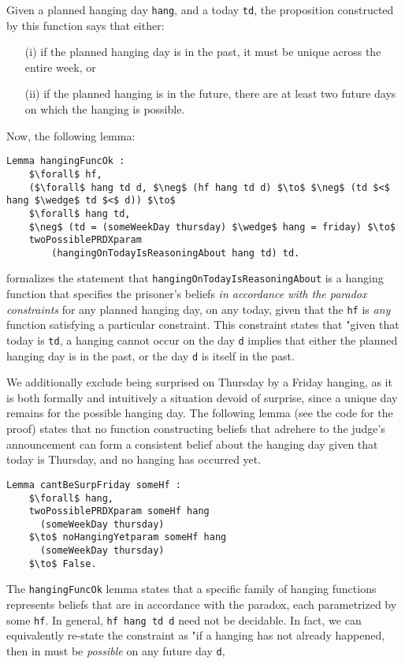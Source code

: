\documentclass[runningheads]{llncs}
\begin{document}
Given a planned hanging day {\tt hang}, and a today {\tt td}, the proposition
constructed by this function says that either:

\begin{itemize}
  \item[(i)] if the planned hanging day is in the past, it must be unique across
  the entire week, or
  \item[(ii)] if the planned hanging is in the future, there are at least two
  future days on which the hanging is possible.
\end{itemize}

Now, the following lemma:

\begin{lstlisting}[mathescape=true]
Lemma hangingFuncOk :
    $\forall$ hf,
    ($\forall$ hang td d, $\neg$ (hf hang td d) $\to$ $\neg$ (td $<$ hang $\wedge$ td $<$ d)) $\to$
    $\forall$ hang td,
    $\neg$ (td = (someWeekDay thursday) $\wedge$ hang = friday) $\to$
    twoPossiblePRDXparam
        (hangingOnTodayIsReasoningAbout hang td) td.
\end{lstlisting}

formalizes the statement that {\tt hangingOnTodayIsReasoningAbout}
is a hanging function that specifies the prisoner's beliefs \emph{in accordance with
the paradox constraints} for any planned hanging day, on any today, given that
the {\tt hf} is \emph{any} function satisfying a particular constraint.
This constraint states that "given that today is {\tt td}, a hanging
cannot occur on
the day {\tt d} implies that either the planned hanging day is in the past, or the day
{\tt d} is itself in the past.

We additionally exclude being surprised
on Thursday by a Friday hanging, as it is both formally and intuitively a
situation devoid
of surprise, since a unique day remains for the possible hanging day.
The following lemma (see the code for the proof) states that no
function constructing beliefs
that adrehere to the judge's announcement can form a consistent belief
about the hanging day given that today is Thursday, and no hanging has occurred yet.

\begin{lstlisting}[mathescape=true]
  Lemma cantBeSurpFriday someHf :
    $\forall$ hang,
    twoPossiblePRDXparam someHf hang
      (someWeekDay thursday)
    $\to$ noHangingYetparam someHf hang
      (someWeekDay thursday)
    $\to$ False.
\end{lstlisting}

The {\tt hangingFuncOk} lemma states that a specific family of hanging functions
represents beliefs that
are in accordance with the paradox, each parametrized by some {\tt hf}.
In general, {\tt hf hang td d} need not be
decidable. In fact, we can equivalently re-state
the constraint as "if a hanging has not already happened, then in must be
\emph{possible} on any future day {\tt d},
\end{document}
